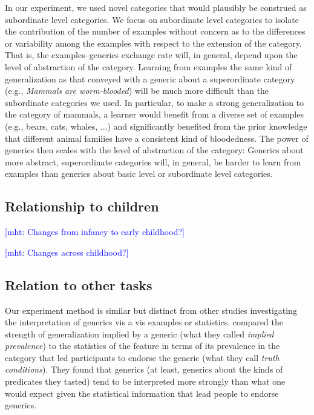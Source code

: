 \documentclass[10pt,letterpaper]{article}
\newcommand{\mht}[1]{\textcolor{Blue}{[mht: #1]}}
\begin{document}
In our experiment, we used novel categories that would plausibly be construed as subordinate level categories.
We focus on subordinate level categories to isolate the contribution of the number of examples without concern as to the differences or variability among the examples with respect to the extension of the category.
That is, the examples--generics exchange rate will, in general, depend upon the level of abstraction of the category. 
Learning from examples the same kind of generalization as that conveyed with a generic about a superordinate category (e.g., \emph{Mammals are worm-blooded}) will be much more difficult than the subordinate categories we used. 
In particular, to make a strong generalization to the category of mammals, a learner would benefit from a diverse set of examples (e.g., bears, cats, whales, ...) and significantly benefited from the prior knowledge that different animal families have a consistent kind of bloodedness. 
The power of generics then scales with the level of abstraction of the category: Generics about more abstract, superordinate categories will, in general, be harder to learn from examples than generics about basic level or subordinate level categories. 

\subsection{Relationship to children}

\mht{Changes from infancy to early childhood?}

\mht{Changes across childhood?}

\subsection{Relation to other tasks}

Our experiment method is similar but distinct from other studies investigating the interpretation of generics vis a vis examples or statistics.
 compared the strength of generalization implied by a generic (what they called \emph{implied prevalence}) to the statistics of the feature in terms of its prevalence in the category that led participants to endorse the generic (what they call \emph{truth conditions}). They found that generics (at least, generics about the kinds of predicates they tasted) tend to be interpreted more strongly than what one would expect given the statistical information that lead people to endorse generics. 
\end{document}
